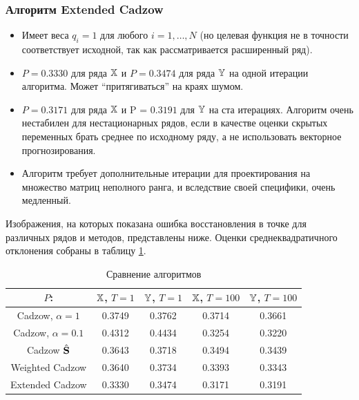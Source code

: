 \documentclass[12pt,a4paper,fleqn,leqno]{article}
\begin{document}
\subsubsection{Алгоритм Extended Cadzow}
\begin{itemize}
\item Имеет веса $q_i = 1$ для любого $i = 1, \ldots, N$ (но целевая функция не в точности соответствует исходной, так как рассматривается расширенный ряд).
\item $P = 0.3330$ для ряда $\mathbb{X}$ и $P = 0.3474$ для ряда $\mathbb{Y}$ на одной итерации алгоритма. Может ``притягиваться'' на краях шумом.
\item $P = 0.3171$ для ряда $\mathbb{X}$ и P = $0.3191$ для $\mathbb{Y}$ на ста итерациях. Алгоритм очень нестабилен для нестационарных рядов, если в качестве оценки скрытых переменных брать среднее по исходному ряду, а не использовать векторное прогнозирования.
\item Алгоритм требует дополнительные итерации для проектирования на множество матриц неполного ранга, и вследствие своей специфики, очень медленный.
\end{itemize}
Изображения, на которых показана ошибка восстановления в точке для различных рядов и методов, представлены ниже. Оценки среднеквадратичного отклонения собраны в таблицу \ref{fintable}.

\begin{table}[!h]
\begin{center}
\caption{Сравнение алгоритмов}\label{fintable}
\begin{tabular}{|c|c|c|c|c|}
\hline
$P$: & $\mathbb{X}$, $T = 1$ & $\mathbb{Y}$, $T = 1$ & $\mathbb{X}$, $T = 100$ & $\mathbb{Y}$, $T = 100$  \\
\hline
Cadzow, $\alpha = 1$ & 0.3749 & 0.3762 & 0.3714 & 0.3661 \\
\hline
Cadzow, $\alpha = 0.1$ & 0.4312 & 0.4434 & 0.3254 & 0.3220 \\
\hline
Cadzow $\hat{\mathbf{S}}$ & 0.3643 & 0.3718 & 0.3494 & 0.3439 \\
\hline
Weighted Cadzow & 0.3640 & 0.3734 & 0.3393 & 0.3343 \\
\hline
Extended Cadzow & 0.3330 & 0.3474 & 0.3171 & 0.3191 \\
\hline
\end{tabular}
\end{center}
\end{table}
\end{document}
